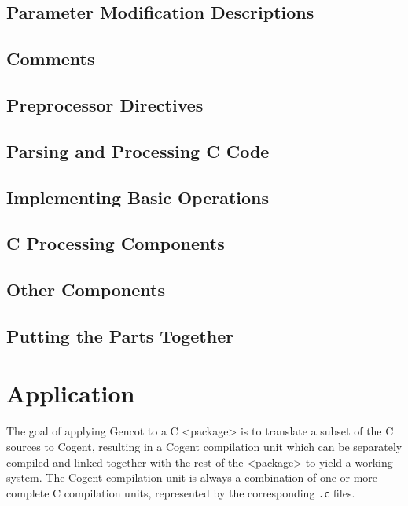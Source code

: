 \documentclass[a4paper]{report}
\newcommand{\code}[1]{\textnormal{\texttt{#1}}}
\begin{document}
\section{Parameter Modification Descriptions}
\label{impl-parmod}


\section{Comments}
\label{impl-comments}


\section{Preprocessor Directives}
\label{impl-preprocessor}


\section{Parsing and Processing C Code}
\label{impl-ccode}


\section{Implementing Basic Operations}
\label{impl-operations}


\section{C Processing Components}
\label{impl-ccomps}


\section{Other Components}
\label{impl-ocomps}


\section{Putting the Parts Together}
\label{impl-all}


\chapter{Application}

The goal of applying Gencot to a C <package> is to translate a subset of the C sources to Cogent,
resulting in a Cogent compilation unit which can be separately compiled and linked together with
the rest of the <package> to yield a working system. The Cogent compilation unit is always a
combination of one or more complete C compilation units, represented by the corresponding \code{.c} 
files.
\end{document}
